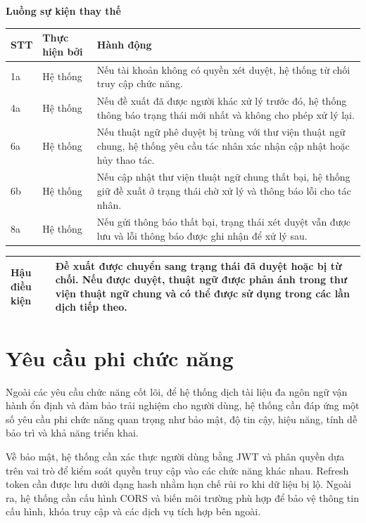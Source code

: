 \documentclass[../DoAn.tex]{subfiles}
\begin{document}
\textbf{Luồng sự kiện thay thế}

\begin{longtable}{|p{1cm}|p{3.3cm}|p{10.2cm}|}
\hline
\textbf{STT} & \textbf{Thực hiện bởi} & \textbf{Hành động} \\ \hline
1a & Hệ thống & Nếu tài khoản không có quyền xét duyệt, hệ thống từ chối truy cập chức năng. \\ \hline
4a & Hệ thống & Nếu đề xuất đã được người khác xử lý trước đó, hệ thống thông báo trạng thái mới nhất và không cho phép xử lý lại. \\ \hline
6a & Hệ thống & Nếu thuật ngữ phê duyệt bị trùng với thư viện thuật ngữ chung, hệ thống yêu cầu tác nhân xác nhận cập nhật hoặc hủy thao tác. \\ \hline
6b & Hệ thống & Nếu cập nhật thư viện thuật ngữ chung thất bại, hệ thống giữ đề xuất ở trạng thái chờ xử lý và thông báo lỗi cho tác nhân. \\ \hline
8a & Hệ thống & Nếu gửi thông báo thất bại, trạng thái xét duyệt vẫn được lưu và lỗi thông báo được ghi nhận để xử lý sau. \\ \hline
\end{longtable}

\begin{longtable}{|p{4cm}|p{10.5cm}|}
\hline
\textbf{Hậu điều kiện} & Đề xuất được chuyển sang trạng thái đã duyệt hoặc bị từ chối. Nếu được duyệt, thuật ngữ được phản ánh trong thư viện thuật ngữ chung và có thể được sử dụng trong các lần dịch tiếp theo. \\ \hline
\end{longtable}

\section{Yêu cầu phi chức năng}
\label{section:2.4}
Ngoài các yêu cầu chức năng cốt lõi, để hệ thống dịch tài liệu đa ngôn ngữ vận hành ổn định và đảm bảo trải nghiệm cho người dùng, hệ thống cần đáp ứng một số yêu cầu phi chức năng quan trọng như bảo mật, độ tin cậy, hiệu năng, tính dễ bảo trì và khả năng triển khai.

Về bảo mật, hệ thống cần xác thực người dùng bằng JWT và phân quyền dựa trên vai trò để kiểm soát quyền truy cập vào các chức năng khác nhau. Refresh token cần được lưu dưới dạng hash nhằm hạn chế rủi ro khi dữ liệu bị lộ. Ngoài ra, hệ thống cần cấu hình CORS và biến môi trường phù hợp để bảo vệ thông tin cấu hình, khóa truy cập và các dịch vụ tích hợp bên ngoài.
\end{document}
